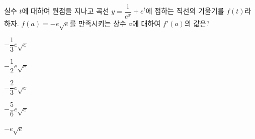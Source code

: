 실수 $t$에 대하여 원점을 지나고 곡선 $y=\dfrac{1}{e^x}+e^t$에 접하는 직선의 기울기를 $f(t)$라 하자. $f(a)=-e\sqrt{e}$를 만족시키는 상수 $a$에 대하여 $f'(a)$의 값은?
\begin{choices32}{\rule[-3ex]{0pt}{8ex}$-\dfrac{1}{3}e\sqrt{e}$}{\rule[-3ex]{0pt}{8ex}$-\dfrac{1}{2}e\sqrt{e}$}{\rule[-3ex]{0pt}{8ex}$-\dfrac{2}{3}e\sqrt{e}$}{\rule[-3ex]{0pt}{8ex}$-\dfrac{5}{6}e\sqrt{e}$}{\rule[-3ex]{0pt}{8ex}$-e\sqrt{e}$}\end{choices32}
